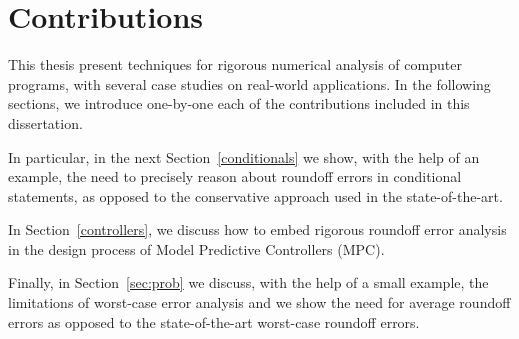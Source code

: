 \section{Contributions}
%
This thesis present techniques for rigorous numerical analysis of computer programs, with several case studies on real-world applications.
%
%
%
In the following sections, we introduce one-by-one each of the contributions included in this dissertation.
%

In particular, in the next Section~\ref{conditionals} we show, with the help of an example, the need to precisely reason about roundoff errors in conditional statements, as opposed to the conservative approach used in the state-of-the-art.
%

In Section~\ref{controllers}, we discuss how to embed rigorous roundoff error analysis in the design process of Model Predictive Controllers (MPC).
%

Finally, in Section~\ref{sec:prob} we discuss, with the help of a small example, the limitations of worst-case error analysis and we show the need for average roundoff errors as opposed to the state-of-the-art worst-case roundoff errors.
%
%

%
%
%
%
%


